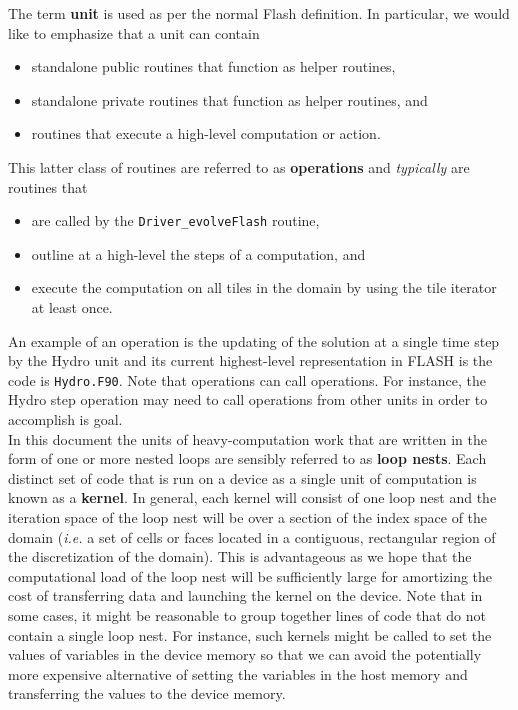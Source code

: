 \documentclass{article}
\begin{document}
The term \textbf{unit} is used as per the normal Flash definition.  In
particular, we would like to emphasize that a unit can contain
\begin{itemize}
\item{standalone public routines that function as helper routines,}
\item{standalone private routines that function as helper routines, and}
\item{routines that execute a high-level computation or action.}
\end{itemize}

This latter class of routines are referred to as \textbf{operations} and
\textit{typically} are routines that
\begin{itemize}
\item{are called by the \texttt{Driver\_evolveFlash} routine,}
\item{outline at a high-level the steps of a computation, and}
\item{execute the computation on all tiles in the domain by using the tile
iterator at least once.}
\end{itemize}
An example of an operation is the updating of the solution at a single time step
by the Hydro unit and its current highest-level representation in FLASH is the
code is \texttt{Hydro.F90}.  Note that operations can call operations.  For
instance, the Hydro step operation may need to call operations from other units
in order to accomplish is goal.\\

In this document the units of heavy-computation work that are written in the
form of one or more nested loops are sensibly referred to as \textbf{loop
nests}.  Each distinct set of code that is run on a device as a single unit of
computation is known as a \textbf{kernel}.  In general, each kernel will consist
of one loop nest and the iteration space of the loop nest will be over a section
of the index space of the domain (\textit{i.e.} a set of cells or faces located
in a contiguous, rectangular region of the discretization of the domain).  This
is advantageous as we hope that the computational load of the loop nest will be
sufficiently large for amortizing the cost of transferring data and launching
the kernel on the device.  Note that in some cases, it might be reasonable to
group together lines of code that do not contain a single loop nest.  For
instance, such kernels might be called to set the values of variables in the
device memory so that we can avoid the potentially more expensive alternative of
setting the variables in the host memory and transferring the values to the device
memory.\\
\end{document}
